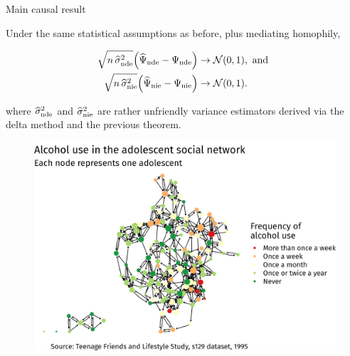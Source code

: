 \documentclass{beamer}
\theoremstyle{remark}
\begin{document}
\begin{frame}{Main causal result}

    \begin{theorem}

        \vspace{2mm}

        Under the same statistical assumptions as before, plus mediating homophily,

        \begin{align*}
            \sqrt{n \, \sigmahatnde} \paren*{\ndehat - \nde}
             & \to
            \Normal{0}{1}, \text { and } \\
            \sqrt{n \, \sigmahatnie} \paren*{\niehat - \nie}
             & \to
            \Normal{0}{1}.
        \end{align*}

        \noindent where $\widehat{\sigma}^2_\text{nde}$ and $\widehat{\sigma}^2_\text{nie}$ are rather unfriendly variance estimators derived via the delta method and the previous theorem.

    \end{theorem}

\end{frame}

\begin{frame}
    \centering
    \vspace{3mm}
    \begin{figure}
        \includegraphics[width=\textwidth]{figures/glasgow-alcohol.png}
    \end{figure}
\end{frame}
\end{document}
